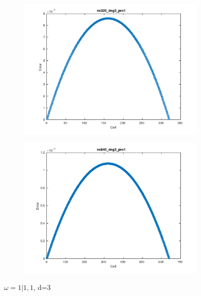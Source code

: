 \documentclass[11pt,a4paper]{article}
\theoremstyle{plain}
\theoremstyle{definition}
\begin{document}
\begin{figure}[H]
\medskip
\begin{subfigure}[b]{0.48\textwidth}
\includegraphics[width=\linewidth]{../../tests_01_01/test_01_01_test9_pro1/output/plots/nc320_deg3_wei111_pro1.pdf}
\end{subfigure}\hspace*{\fill}
\begin{subfigure}[b]{0.48\textwidth}
\includegraphics[width=\linewidth]{../../tests_01_01/test_01_01_test9_pro1/output/plots/nc640_deg3_wei111_pro1.pdf}
\end{subfigure}

\caption{$\omega=1|1,1$, d=3}
\end{figure}
\end{document}
